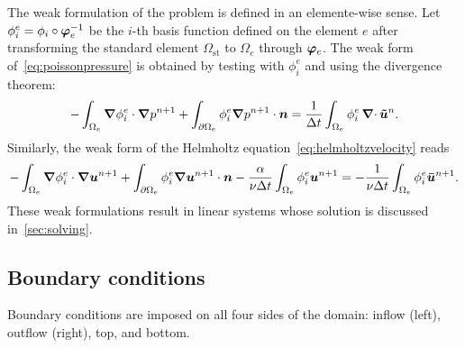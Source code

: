 \documentclass[../main.tex]{subfiles}
\begin{document}
The weak formulation of the problem is defined in an elemente-wise sense. Let $\phi_i^e=\phi_i\circ\bm{\varphi}_e^{-1}$ be the $i$-th basis function defined on the element $e$ after transforming the standard element $\Omega_{\text{st}}$ to $\Omega_e$ through $\bm{\varphi}_e$. The weak form of~\eqref{eq:poissonpressure} is obtained by testing with $\phi_{i}^e$ and using the divergence theorem:
\begin{equation}
	-\int_{\Omega_e} \grad \phi_{i}^e \cdot \grad p^{n+1} +\int_{\partial\Omega_e} \phi_{i}^e \grad p^{n+1} \cdot \bm{n} = \frac{1}{\Delta t} \int_{\Omega_e} \phi_{i}^e \operatorname{\bm{\nabla}\cdot} \bm{\tilde{u}}^n.
	 \label{eq:weakpoissonpressure}
\end{equation}
Similarly, the weak form of the Helmholtz equation~\eqref{eq:helmholtzvelocity} reads
\begin{equation}
	-\int_{\Omega_e} \grad \phi_{i}^e \cdot \grad \bm{u}^{n+1} + \int_{\partial\Omega_e} \phi_{i}^e \grad \bm{u}^{n+1} \cdot \bm{n} - \frac{\alpha}{\nu \Delta t} \int_{\Omega_e} \phi_{i}^e \bm{u}^{n+1} = -\frac{1}{\nu \Delta t} \int_{\Omega_e} \phi_{i}^e \bm{\bar{u}}^{n+1}.
	\label{eq:weakhelmholtzvelocity}
\end{equation}
These weak formulations result in linear systems whose solution is discussed in~\cref{sec:solving}.

\subsection{Boundary conditions}\label{sec:boundaryconditions}



Boundary conditions are imposed on all four sides of the domain: inflow (left), outflow (right), top, and bottom.
\end{document}
